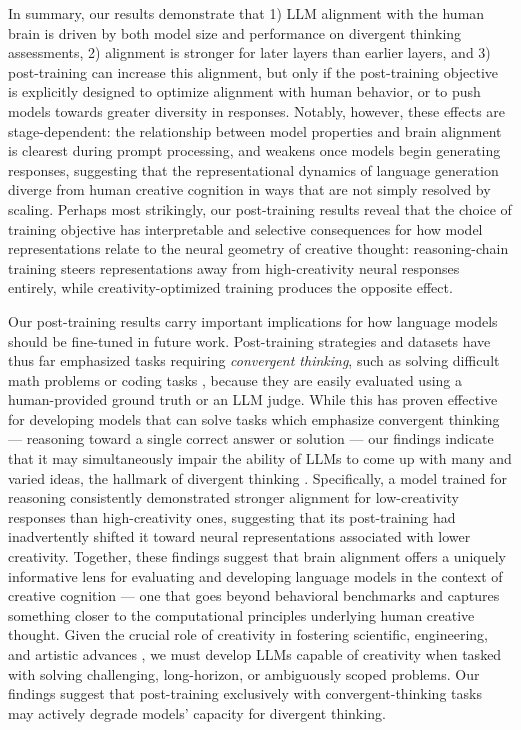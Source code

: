 In summary, our results demonstrate that 1) LLM alignment with the human brain is driven by both model size and performance on divergent thinking assessments, 2) alignment is stronger for later layers than earlier layers, and 3) post-training can increase this alignment, but only if the post-training objective is explicitly designed to optimize alignment with human behavior, or to push models towards greater diversity in responses. Notably, however, these effects are stage-dependent: the relationship between model properties and brain alignment is clearest during prompt processing, and weakens once models begin generating responses, suggesting that the representational dynamics of language generation diverge from human creative cognition in ways that are not simply resolved by scaling. Perhaps most strikingly, our post-training results reveal that the choice of training objective has interpretable and selective consequences for how model representations relate to the neural geometry of creative thought: reasoning-chain training steers representations away from high-creativity neural responses entirely, while creativity-optimized training produces the opposite effect. 

Our post-training results carry important implications for how language models should be fine-tuned in future work. Post-training strategies and datasets have thus far emphasized tasks requiring \textit{convergent thinking}, such as solving difficult math problems or coding tasks \citep{deepseekai2025deepseekr1incentivizingreasoningcapability, lightman2023let, chen2021evaluating}, because they are easily evaluated using a human-provided ground truth or an LLM judge. While this has proven effective for developing models that can solve tasks which emphasize convergent thinking --- reasoning toward a single correct answer or solution --- our findings indicate that it may simultaneously impair the ability of LLMs to come up with many and varied ideas, the hallmark of divergent thinking \citep{runco2012divergent}. Specifically, a model trained for reasoning consistently demonstrated stronger alignment for low-creativity responses than high-creativity ones, suggesting that its post-training had inadvertently shifted it toward neural representations associated with lower creativity. Together, these findings suggest that brain alignment offers a uniquely informative lens for evaluating and developing language models in the context of creative cognition — one that goes beyond behavioral benchmarks and captures something closer to the computational principles underlying human creative thought. Given the crucial role of creativity in fostering scientific, engineering, and artistic advances \citep{torrance1974torrance, guilford1967nature}, we must develop LLMs capable of creativity when tasked with solving challenging, long-horizon, or ambiguously scoped problems. Our findings suggest that post-training exclusively with convergent-thinking tasks may actively degrade models' capacity for divergent thinking.